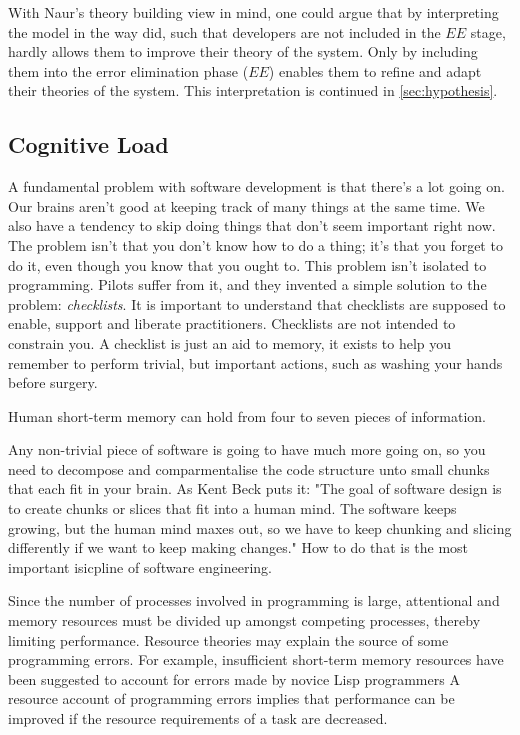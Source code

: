 With Naur's theory building view in mind, one could argue that by interpreting the model in the way \citeauthor{northover_agile_2007} did, such that developers are not included in the $EE$ stage, hardly allows them to improve their theory of the system.
Only by including them into the error elimination phase ($EE$) enables them to refine and adapt their theories of the system.
This interpretation is continued in \ref{sec:hypothesis}.


\subsection{Cognitive Load}

\cite{seemann_code_2021}
A fundamental problem with software development is that there's a lot going on. Our brains aren't good at keeping track of many things at the same time.
We also have a tendency to skip doing things that don't seem important right now.
The problem isn't that you don't know how to do a thing; it's that you forget to do it, even though you know that you ought to.
This problem isn't isolated to programming. Pilots suffer from it, and they invented a simple solution to the problem: \emph{checklists}.
It is important to understand that checklists are supposed to enable, support and liberate practitioners.
Checklists are not intended to constrain you.
A checklist is just an aid to memory, it exists to help you remember to perform trivial, but important actions, such as washing your hands before surgery.

Human short-term memory can hold from four to seven pieces of information. \cite{shaw_memory_2016}

Any non-trivial piece of software is going to have much more going on, so you need to decompose and comparmentalise the code structure unto small chunks that each fit in your brain.
As Kent Beck puts it:
"The goal of software design is to create chunks or slices that fit into a human mind. The software keeps growing, but the human mind maxes out, so we have to keep chunking and slicing differently if we want to keep making changes."
How to do that is the most important isicpline of software engineering.

\cite{ormerod_human_1990}
Since the number of processes involved in programming is large, attentional and memory resources must be divided up amongst competing processes, thereby limiting performance.
Resource theories may explain the source of some programming errors.
For example, insufficient short-term memory resources have been suggested to account for errors made by novice Lisp programmers
A resource account of programming errors implies that performance can be improved if the resource requirements of a task are decreased.

